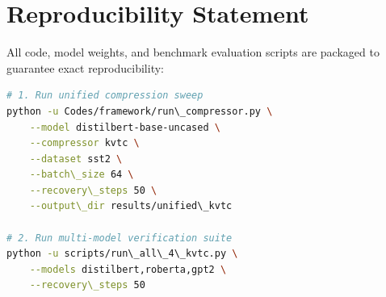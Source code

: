 \section{Reproducibility Statement}
All code, model weights, and benchmark evaluation scripts are packaged to guarantee exact reproducibility:
\begin{lstlisting}[language=bash]
# 1. Run unified compression sweep
python -u Codes/framework/run\_compressor.py \
    --model distilbert-base-uncased \
    --compressor kvtc \
    --dataset sst2 \
    --batch\_size 64 \
    --recovery\_steps 50 \
    --output\_dir results/unified\_kvtc

# 2. Run multi-model verification suite
python -u scripts/run\_all\_4\_kvtc.py \
    --models distilbert,roberta,gpt2 \
    --recovery\_steps 50
\end{lstlisting}
